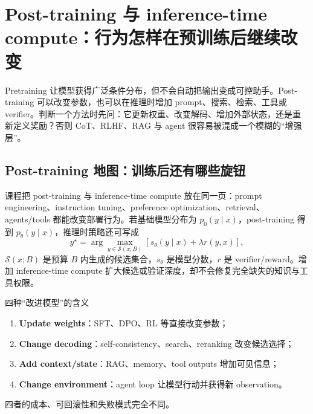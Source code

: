 \section{Post-training 与 inference-time compute：行为怎样在预训练后继续改变}

Pretraining 让模型获得广泛条件分布，但不会自动把输出变成可控助手。Post-training 可以改变参数，也可以在推理时增加 prompt、搜索、检索、工具或 verifier。判断一个方法时先问：它更新权重、改变解码、增加外部状态，还是重新定义奖励？否则 CoT、RLHF、RAG 与 agent 很容易被混成一个模糊的“增强层”。

\subsection{Post-training 地图：训练后还有哪些旋钮}

课程把 post-training 与 inference-time compute 放在同一页：prompt engineering、instruction tuning、preference optimization、retrieval、agents/tools 都能改变部署行为。若基础模型分布为 $p_0(y\mid x)$，post-training 得到 $p_{\theta}(y\mid x)$，推理时策略还可写成
\[
y^{\star}=\arg\max_{y\in\mathcal{S}(x;B)}
\left[s_{\theta}(y\mid x)+\lambda r(y,x)\right],
\]
$\mathcal{S}(x;B)$ 是预算 $B$ 内生成的候选集合，$s_{\theta}$ 是模型分数，$r$ 是 verifier/reward。增加 inference-time compute 扩大候选或验证深度，却不会修复完全缺失的知识与工具权限。



\begin{importantbox}{四种“改进模型”的含义}
\begin{enumerate}
  \item \textbf{Update weights}：SFT、DPO、RL 等直接改变参数；
  \item \textbf{Change decoding}：self-consistency、search、reranking 改变候选选择；
  \item \textbf{Add context/state}：RAG、memory、tool outputs 增加可见信息；
  \item \textbf{Change environment}：agent loop 让模型行动并获得新 observation。
\end{enumerate}
四者的成本、可回滚性和失败模式完全不同。
\end{importantbox}

